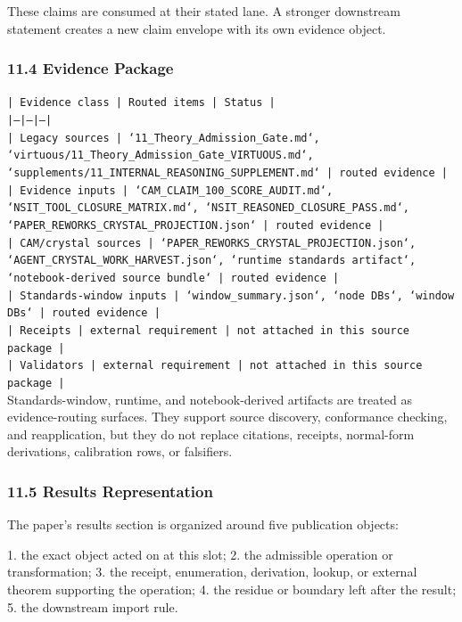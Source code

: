 \documentclass[11pt]{article}
\begin{document}
These claims are consumed at their stated lane. A stronger downstream statement
creates a new claim envelope with its own evidence object.

\subsubsection*{11.4 Evidence Package}

\noindent\texttt{| Evidence class | Routed items | Status |}\\
\noindent\texttt{|---|---|---|}\\
\noindent\texttt{| Legacy sources | `11\_Theory\_Admission\_Gate.md`, `virtuous/11\_Theory\_Admission\_Gate\_VIRTUOUS.md`, `supplements/11\_INTERNAL\_REASONING\_SUPPLEMENT.md` | routed evidence |}\\
\noindent\texttt{| Evidence inputs | `CAM\_CLAIM\_100\_SCORE\_AUDIT.md`, `NSIT\_TOOL\_CLOSURE\_MATRIX.md`, `NSIT\_REASONED\_CLOSURE\_PASS.md`, `PAPER\_REWORKS\_CRYSTAL\_PROJECTION.json` | routed evidence |}\\
\noindent\texttt{| CAM/crystal sources | `PAPER\_REWORKS\_CRYSTAL\_PROJECTION.json`, `AGENT\_CRYSTAL\_WORK\_HARVEST.json`, `runtime standards artifact`, `notebook-derived source bundle` | routed evidence |}\\
\noindent\texttt{| Standards-window inputs | `window\_summary.json`, `node DBs`, `window DBs` | routed evidence |}\\
\noindent\texttt{| Receipts | external requirement | not attached in this source package |}\\
\noindent\texttt{| Validators | external requirement | not attached in this source package |}\\

Standards-window, runtime, and notebook-derived artifacts are treated
as evidence-routing surfaces. They support source discovery, conformance
checking, and reapplication, but they do not replace citations, receipts,
normal-form derivations, calibration rows, or falsifiers.

\subsubsection*{11.5 Results Representation}

The paper's results section is organized around five publication objects:

1. the exact object acted on at this slot;
2. the admissible operation or transformation;
3. the receipt, enumeration, derivation, lookup, or external theorem supporting
   the operation;
4. the residue or boundary left after the result;
5. the downstream import rule.
\end{document}
